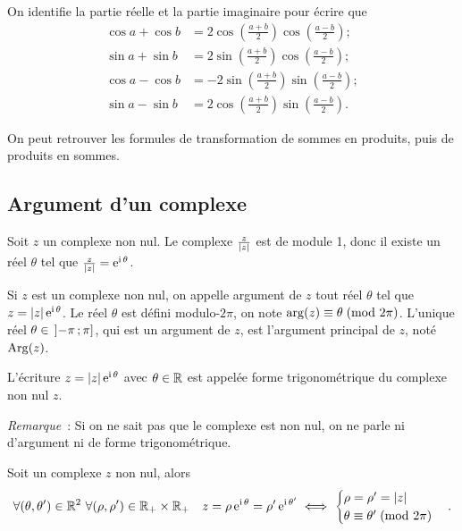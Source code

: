 On identifie la partie réelle et la partie imaginaire pour écrire que
\begin{align}
  \cos a + \cos b &= 2 \cos \left( \frac{a + b}{2} \right) \cos 
  \left(\frac{a-b}{2} \right);\\
  \sin a + \sin b &= 2 \sin \left( \frac{a + b}{2} \right) \cos 
  \left(\frac{a-b}{2} \right);\\
  \cos a - \cos b &= -2 \sin \left( \frac{a + b}{2} \right) \sin 
  \left(\frac{a-b}{2} \right);\\
  \sin a - \sin b &= 2 \cos \left( \frac{a + b}{2} \right) \sin 
  \left(\frac{a-b}{2} \right).
\end{align}

On peut retrouver les formules de transformation de sommes en produits, puis de 
produits en sommes.

\subsection{Argument d'un complexe}
\label{subsec:argumentcomplexe}

Soit \(z\) un complexe non nul. Le complexe \(\frac{z}{\left\lvert z\right\rvert}\) est de module 
1, donc il existe un réel \(\theta\) tel que 
\(\frac{z}{\left\lvert z\right\rvert} = \operatorname{e}^{\operatorname{i} \theta}\).

\begin{defdef}
  Si \(z\) est un complexe non nul, on appelle argument de \(z\) tout réel 
  \(\theta\) tel que \(z = \left\lvert z\right\rvert \operatorname{e}^{\operatorname{i} \theta}\).  Le réel \(\theta\) est 
  défini modulo-\(2\pi\), on note \(\arg(z) \equiv \theta\!\pmod {2\pi}\). L'unique 
  réel \(\theta \in{}\left] -\pi \, ; {} \pi \right]\), qui est un argument de \(z\), 
  est l'argument principal de \(z\), noté \(\operatorname{Arg}(z)\).
\end{defdef}

L'écriture \(z = \left\lvert z\right\rvert \operatorname{e}^{\operatorname{i} \theta}\) avec \(\theta \in{}\mathbb{R}\) est appelée 
forme trigonométrique du complexe non nul \(z\).

\emph{Remarque}~: Si on ne sait pas que le complexe est non nul, on ne parle ni 
d'argument ni de forme trigonométrique.

\begin{prop}
  Soit un complexe \(z\) non nul, alors
  \begin{equation}
    \forall (\theta, \theta') \in{}\mathbb{R}^2 \ \forall (\rho, \rho') \in{}\mathbb{R}_{+} 
    \times \mathbb{R}_{+} \quad z = \rho \operatorname{e}^{\operatorname{i} \theta} = \rho' \operatorname{e}^{\operatorname{i} \theta'} 
    \iff
    \begin{cases}
      \rho = \rho' = \left\lvert z\right\rvert \\
      \theta \equiv \theta'\!\pmod {2\pi}
    \end{cases}.
  \end{equation}
\end{prop}

